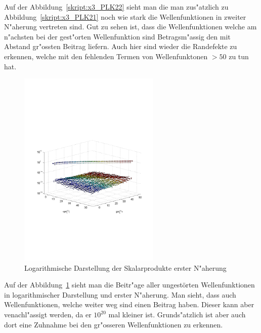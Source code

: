 \begin{refsection}
Auf der Abbildung~\ref{skript:x3_PLK22} sieht man die man zus"atzlich zu Abbildung~\ref{skript:x3_PLK21} noch wie stark die Wellenfunktionen in zweiter N"aherung vertreten sind. Gut zu sehen ist, dass die Wellenfunktionen welche am n"achsten bei der gest"orten Wellenfunktion sind Betragsm"assig den mit Abstand gr"ossten Beitrag  liefern. Auch hier sind wieder die Randefekte zu erkennen, welche mit den fehlenden Termen von Wellenfunktonen $> 50$ zu tun hat.

\begin{figure}[h]	%
\centering
\includegraphics[width=0.6\textwidth]{anharmonisch/images/x3/PLK(1)log(abs)(1Stoerung).pdf}
\caption{Logarithmische Darstellung der Skalarprodukte erster N"aherung
\label{skript:x3_PLK(1)log(abs)(1Stoerung)}}
\end{figure}

Auf der Abbildung~\ref{skript:x3_PLK(1)log(abs)(1Stoerung)} sieht man die Beitr"age aller ungestörten Wellenfunktionen in logarithmischer Darstellung und erster N"aherung. Man sieht, dass auch Wellenfunktionen, welche weiter weg sind einen Beitrag haben. Dieser kann aber venachl"assigt werden, da er $10^20$ mal kleiner ist. Grunds"atzlich ist aber auch dort eine Zuhnahme bei den gr"osseren Wellenfunktionen zu erkennen.


\end{refsection}
